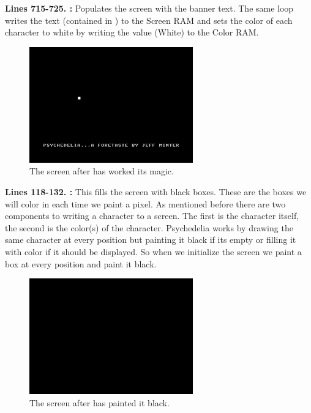 \textbf{Lines 715-725. :} Populates the screen with the banner text. The same loop writes
the text (contained in ) to the Screen RAM and sets the color of each character to white by writing the
value  (White) to the Color RAM.

\begin{figure}[H]
    \centering
      \includegraphics[height=5cm]{src/listing_commentary/foretaste.png}
  \caption*{The screen after  has worked its magic.}
\end{figure}

\bigskip
\bigskip
\bigskip
\bigskip
\textbf{Lines 118-132. :} This fills the screen with black boxes. These are the boxes we will color in each time we paint a pixel.
As mentioned before there are two components to writing a character to a screen. The first is the character
itself, the second is the color(s) of the character. Psychedelia works by drawing the same character at every
position but painting it black if its empty or filling it with color if it should be displayed. So when
we initialize the screen we paint a box at every position and paint it black.

\begin{figure}[H]
    \centering
      \includegraphics[height=5cm]{src/listing_commentary/black.png}
  \caption*{The screen after  has painted it black.}
\end{figure}

